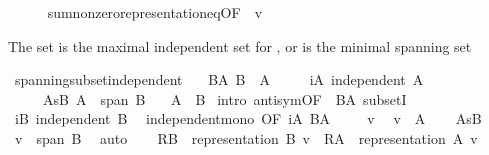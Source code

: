 \begin{isabellebody}
\ \ \ \ \isamarkupfalse%
\ sum{\isacharunderscore}{\kern0pt}nonzero{\isacharunderscore}{\kern0pt}representation{\isacharunderscore}{\kern0pt}eq{\isacharbrackleft}{\kern0pt}OF\ {\isacharasterisk}{\kern0pt}\ v{\isacharbrackright}{\kern0pt}\ \isacommand{{\isachardot}{\kern0pt}}\isamarkupfalse%
\isanewline
{}\isamarkupfalse%
%
\endisatagproof
{\isafoldproof}%
%
\isadelimproof
%
\endisadelimproof
%
\begin{isamarkuptext}%
The set  is the maximal independent set for , or  is the minimal spanning set%
\end{isamarkuptext}\isamarkuptrue%
\isamarkupfalse%
\ spanning{\isacharunderscore}{\kern0pt}subset{\isacharunderscore}{\kern0pt}independent{\isacharcolon}{\kern0pt}\isanewline
\ \ \ BA{\isacharcolon}{\kern0pt}\ {\isachardoublequoteopen}B\ {\isasymsubseteq}\ A{\isachardoublequoteclose}\isanewline
\ \ \ \ \ iA{\isacharcolon}{\kern0pt}\ {\isachardoublequoteopen}independent\ A{\isachardoublequoteclose}\isanewline
\ \ \ \ \ AsB{\isacharcolon}{\kern0pt}\ {\isachardoublequoteopen}A\ {\isasymsubseteq}\ span\ B{\isachardoublequoteclose}\isanewline
\ \ \ {\isachardoublequoteopen}A\ {\isacharequal}{\kern0pt}\ B{\isachardoublequoteclose}\isanewline
%
\isadelimproof
%
\endisadelimproof
%
\isatagproof
{}\isamarkupfalse%
\ {\isacharparenleft}{\kern0pt}intro\ antisym{\isacharbrackleft}{\kern0pt}OF\ {\isacharunderscore}{\kern0pt}\ BA{\isacharbrackright}{\kern0pt}\ subsetI{\isacharparenright}{\kern0pt}\isanewline
\ \ \isamarkupfalse%
\ iB{\isacharcolon}{\kern0pt}\ {\isachardoublequoteopen}independent\ B{\isachardoublequoteclose}\ \isamarkupfalse%
\ independent{\isacharunderscore}{\kern0pt}mono\ {\isacharbrackleft}{\kern0pt}OF\ iA\ BA{\isacharbrackright}{\kern0pt}\ \isacommand{{\isachardot}{\kern0pt}}\isamarkupfalse%
\isanewline
\ \ \isamarkupfalse%
\ v\ \isamarkupfalse%
\ {\isachardoublequoteopen}v\ {\isasymin}\ A{\isachardoublequoteclose}\isanewline
\ \ \isamarkupfalse%
\ AsB\ \isamarkupfalse%
\ {\isachardoublequoteopen}v\ {\isasymin}\ span\ B{\isachardoublequoteclose}\ \isamarkupfalse%
\ auto\isanewline
\ \ \isamarkupfalse%
\ {\isacharquery}{\kern0pt}RB\ {\isacharequal}{\kern0pt}\ {\isachardoublequoteopen}representation\ B\ v{\isachardoublequoteclose}\ \ {\isacharquery}{\kern0pt}RA\ {\isacharequal}{\kern0pt}\ {\isachardoublequoteopen}representation\ A\ v{\isachardoublequoteclose}\isanewline

\end{isabellebody}
